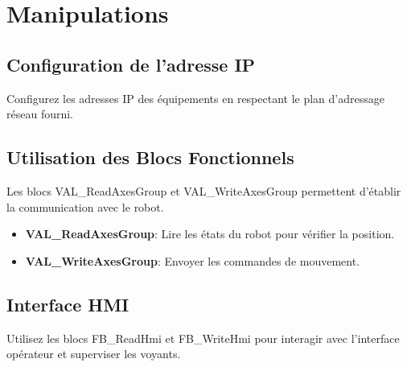 
\section{Manipulations}
\begin{UPSTIactivite}
\subsection{Configuration de l'adresse IP}
Configurez les adresses IP des équipements en respectant le plan d'adressage réseau fourni.
\subsection{Utilisation des Blocs Fonctionnels}
Les blocs VAL\_ReadAxesGroup et VAL\_WriteAxesGroup permettent d’établir la communication avec le robot.
\begin{itemize}
    \item \textbf{VAL\_ReadAxesGroup}: Lire les états du robot pour vérifier la position.
    \item \textbf{VAL\_WriteAxesGroup}: Envoyer les commandes de mouvement.
\end{itemize}
\subsection{Interface HMI}
Utilisez les blocs FB\_ReadHmi et FB\_WriteHmi pour interagir avec l'interface opérateur et superviser les voyants.
\end{UPSTIactivite}
